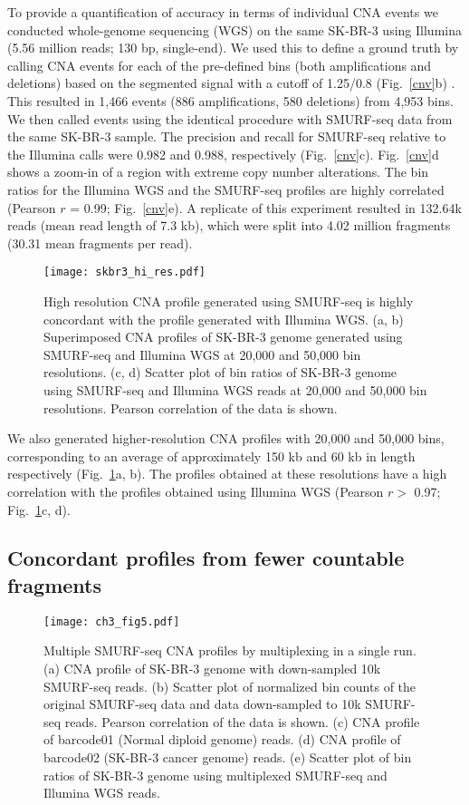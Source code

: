 To provide a quantification of accuracy in terms of individual CNA
events we conducted whole-genome sequencing (WGS) on the same SK-BR-3
using Illumina (5.56 million reads; 130 bp, single-end).  We used this
to define a ground truth by calling CNA events for each of the
pre-defined bins (both amplifications and deletions) based on the
segmented signal with a cutoff of 1.25/0.8 (Fig.~\ref{cnv}b)
\citep{dago2014rapid,berry2017potential}. This resulted in 1,466 events
(886 amplifications, 580 deletions) from 4,953 bins. We then called
events using the identical procedure with SMURF-seq data from the same
SK-BR-3 sample. The precision and recall for SMURF-seq relative to the
Illumina calls were 0.982 and 0.988, respectively (Fig.~\ref{cnv}c).
Fig.~\ref{cnv}d shows a zoom-in of a region with extreme copy number
alterations. The bin ratios for the Illumina WGS and the SMURF-seq
profiles are highly correlated (Pearson $r$ = 0.99; Fig.~\ref{cnv}e).
A replicate of this experiment resulted in 132.64k reads (mean read
length of 7.3 kb), which were split into 4.02 million fragments (30.31
mean fragments per read).

\begin{figure}[t!]
\centering
\texttt{[image: skbr3\_hi\_res.pdf]}
\caption[High resolution CNA profile with SMURF-seq]{
  High resolution CNA profile generated using SMURF-seq is highly concordant
  with the profile generated with Illumina WGS.
  (a, b) Superimposed CNA profiles of SK-BR-3 genome generated using SMURF-seq
  and Illumina WGS at 20,000 and 50,000 bin resolutions.
  (c, d) Scatter plot of bin ratios of SK-BR-3 genome using
  SMURF-seq and Illumina WGS reads at 20,000 and 50,000 bin resolutions.
  Pearson correlation of the data is shown.}
  \label{skbr3_hi_res}
\end{figure}

We also generated higher-resolution CNA profiles with 20,000 and 50,000
bins, corresponding to an average of approximately 150 kb and 60 kb in
length respectively (Fig.~\ref{skbr3_hi_res}a, b). The profiles obtained
at these resolutions have a high correlation with the profiles obtained
using Illumina WGS (Pearson $r>$ 0.97; Fig.~\ref{skbr3_hi_res}c, d).

\subsection{Concordant profiles from fewer countable fragments}
\begin{figure}[t!]
\centering
\texttt{[image: ch3\_fig5.pdf]}
\caption[Multiple SMURF-seq CNA profiles by multiplexing in a single run]{
  Multiple SMURF-seq CNA profiles by multiplexing in a single run.
  (a) CNA profile of SK-BR-3 genome with down-sampled 10k SMURF-seq reads.
  (b) Scatter plot of normalized bin counts of the original SMURF-seq
  data and data down-sampled to 10k SMURF-seq reads. Pearson
  correlation of the data is shown.
  (c) CNA profile of barcode01 (Normal diploid genome) reads.
  (d) CNA profile of barcode02 (SK-BR-3 cancer genome) reads.
  (e) Scatter plot of bin ratios of SK-BR-3 genome using
  multiplexed SMURF-seq and Illumina WGS reads.}
\label{cnv_mux}
\end{figure}

